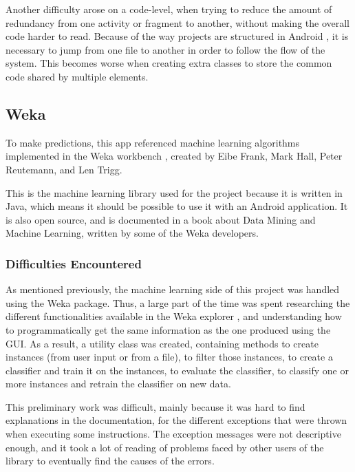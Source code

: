 \documentclass{mproj}
\begin{document}
Another difficulty arose on a code-level, when trying to reduce the amount of redundancy from one activity or fragment to another, without making the overall code harder to read. Because of the way projects are structured in Android \cite{androidprojects}, it is necessary to jump from one file to another in order to follow the flow of the system. This becomes worse when creating extra classes to store the common code shared by multiple elements.

\subsection{Weka}

To make predictions, this app referenced machine learning algorithms implemented in the Weka workbench \cite{weka}, created by Eibe Frank, Mark Hall, Peter Reutemann, and Len Trigg.

This is the machine learning library used for the project because it is written in Java, which means it should be possible to use it with an Android application. It is also open source, and is documented in a book about Data Mining and Machine Learning, written by some of the Weka developers. \cite{wekabook}

\subsubsection*{Difficulties Encountered}\label{wekadiff}

As mentioned previously, the machine learning side of this project was handled using the Weka package. Thus, a large part of the time was spent researching the different functionalities available in the Weka explorer \cite{wekaexplorer}, and understanding how to programmatically get the same information as the one produced using the GUI. As a result, a utility class was created, containing methods to create instances (from user input or from a file), to filter those instances, to create a classifier and train it on the instances, to evaluate the classifier, to classify one or more instances and retrain the classifier on new data. \par

This preliminary work was difficult, mainly because it was hard to find explanations in the documentation, for the different exceptions that were thrown when executing some instructions. The exception messages were not descriptive enough, and it took a lot of reading of problems faced by other users of the library to eventually find the causes of the errors. \par
\end{document}
